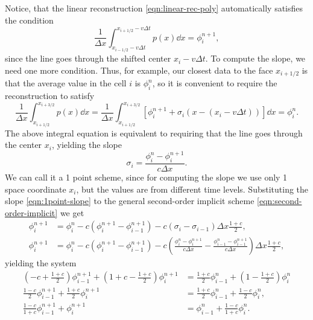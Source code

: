 \documentclass[../thesis.tex]{subfiles}
\begin{document}
Notice, that the linear reconstruction \eqref{eqn:linear-rec-poly} automatically satisfies the condition
\begin{equation}
    \frac{1}{\Delta x}
    \int_{x_{i-1/2}-v\Delta t}^{x_{i+1/2}-v\Delta t}
    p(x)\dd{x}
    = \phi_{i}^{n+1},
\end{equation}
since the line goes through the shifted center \(x_{i} - v\Delta t\). To compute the slope, we need one more condition. Thus, for example, our closest data to the face \(x_{i+1/2}\) is that the average value in the cell \(i\) is \(\phi_{i}^{n}\), so it is convenient to require the reconstruction to satisfy
\begin{equation}
    \frac{1}{\Delta x}
    \int_{x_{i+1/2}}^{x_{i+3/2}}
    p(x)\dd{x}
    =
    \frac{1}{\Delta x}
    \int_{x_{i+1/2}}^{x_{i+3/2}}
    \left[ \phi_{i}^{n+1} + \sigma_{i}
    \left( x - (x_{i}-v\Delta t) \right) \right]\dd{x}
    = \phi_{i}^{n}.
\end{equation}
The above integral equation is equivalent to requiring that the line goes through the center \(x_{i}\), yielding the slope
\begin{equation}
    \label{eqn:1point-slope}
    \sigma_{i} = \frac{\phi_{i}^{n} - \phi_{i}^{n+1}}{c \Delta x}.
\end{equation}
We can call it a 1 point scheme, since for computing the slope we use only 1 space coordinate \(x_{i}\), but the values are from different time levels.
Substituting the slope \eqref{eqn:1point-slope} to the general second-order implicit scheme \eqref{eqn:second-order-implicit} we get
\begin{equation}
    \begin{split}
        \phi_{i}^{n+1} &= \phi_{i}^{n} - c\left(
        \phi_{i}^{n+1}
        - \phi_{i-1}^{n+1}
        \right)
        -c\left(
        \sigma_{i} - \sigma_{i-1}
        \right)\Delta x\frac{1+c}{2},
        \\
        \phi_{i}^{n+1} &= \phi_{i}^{n} - c\left(
        \phi_{i}^{n+1}
        - \phi_{i-1}^{n+1}
        \right)
        -c\left(
            \frac{\phi_{i}^{n} - \phi_{i}^{n+1}}{c \Delta x}
            - \frac{\phi_{i-1}^{n} - \phi_{i-1}^{n+1}}{c \Delta x}
        \right)\Delta x\frac{1+c}{2},
    \end{split}
\end{equation}
yielding the system
\begin{equation}
    \label{eqn:1point-system}
    \begin{split}
        \left( -c + \frac{1+c}{2} \right)
        \phi_{i-1}^{n+1}
        + \left( 1 + c - \frac{1+c}{2} \right)
        \phi_{i}^{n+1}
        &=
        \frac{1+c}{2}\phi_{i-1}^{n}
        + \left( 1 - \frac{1+c}{2} \right)
        \phi_{i}^{n}
        \\
        \frac{1-c}{2}
        \phi_{i-1}^{n+1}
        + \frac{1+c}{2}
        \phi_{i}^{n+1}
        &=
        \frac{1+c}{2}\phi_{i-1}^{n}
        + \frac{1-c}{2}
        \phi_{i}^{n},
        \\
        \frac{1-c}{1+c}
        \phi_{i-1}^{n+1}
        + \phi_{i}^{n+1}
        &=
        \phi_{i-1}^{n}
        + \frac{1-c}{1+c}
        \phi_{i}^{n}.
    \end{split}
\end{equation}
\end{document}
